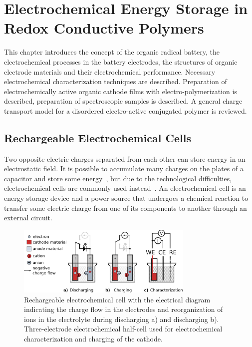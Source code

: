 \chapter{Electrochemical Energy Storage in Redox Conductive Polymers}
This chapter introduces the concept of the organic radical battery, the electrochemical processes in the battery electrodes, the structures of organic electrode materials and their electrochemical performance. Necessary electrochemical characterization techniques are described. Preparation of electrochemically active organic cathode films with electro-polymerization is described, preparation of spectroscopic samples is described. A general charge transport model for a disordered electro-active conjugated polymer is reviewed.

\section{Rechargeable Electrochemical Cells}
Two opposite electric charges separated from each other can store energy in an electrostatic field. It is possible to accumulate many charges on the plates of a capacitor and store some energy~\cite{He_2022}, but due to the technological difficulties, electrochemical cells are commonly used instead~\cite{Figgener_2020}. An electrochemical cell is an energy storage device and a power source that undergoes a chemical reaction to transfer some electric charge from one of its components to another through an external circuit. 

\begin{figure}[h]
\center
	\includegraphics[width=0.75\textwidth]{./electrochemistry/figures/echem_cells.pdf}
	\caption{Rechargeable electrochemical cell with the electrical diagram indicating the charge flow in the electrodes and reorganization of ions in the electrolyte during discharging a) and discharging b). Three-electrode electrochemical half-cell used for electrochemical characterization and charging of the cathode.}
	\label{fig:echem_cells}
\end{figure}


